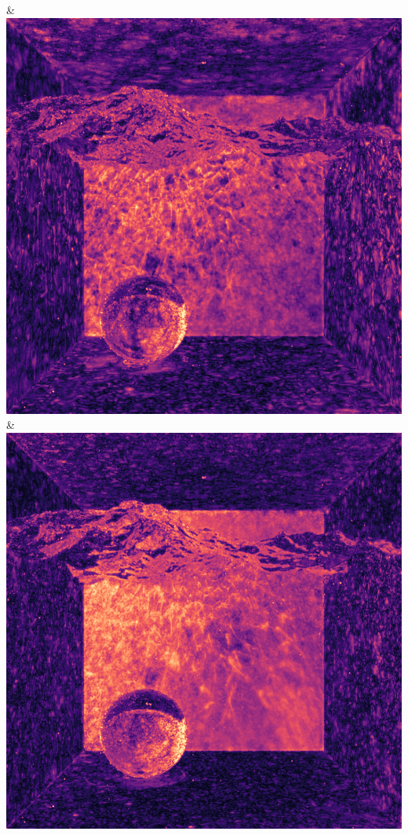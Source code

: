 & \includegraphics[width=\linewidth]{figures/py/tests/sppc_optimization/nrc+sppc14@4_1spp_caustics_small_flip.png}
& \includegraphics[width=\linewidth]{figures/py/tests/sppc_optimization/nrc+sppc16@1_1spp_caustics_small_flip.png}
